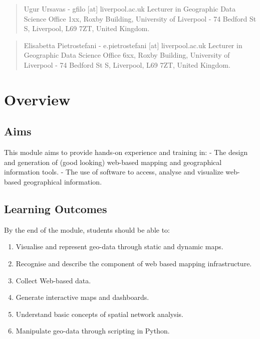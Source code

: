 \documentclass[
  letterpaper,
  DIV=11,
  numbers=noendperiod]{scrreprt}
\providecommand{\tightlist}{%
  \setlength{\itemsep}{0pt}\setlength{\parskip}{0pt}}\usepackage{longtable,booktabs,array}
\begin{document}
\begin{quote}
Ugur Ursavas - gfilo {[}at{]} liverpool.ac.uk Lecturer in Geographic
Data Science Office 1xx, Roxby Building, University of Liverpool - 74
Bedford St S, Liverpool, L69 7ZT, United Kingdom.
\end{quote}

\begin{quote}
Elisabetta Pietrostefani - e.pietrostefani {[}at{]} liverpool.ac.uk
Lecturer in Geographic Data Science Office 6xx, Roxby Building,
University of Liverpool - 74 Bedford St S, Liverpool, L69 7ZT, United
Kingdom.
\end{quote}


\chapter*{Overview}\label{overview}


\section*{Aims}\label{aims}


This module aims to provide hands-on experience and training in: - The
design and generation of (good looking) web-based mapping and
geographical information tools. - The use of software to access, analyse
and visualize web-based geographical information.

\section*{Learning Outcomes}\label{learning-outcomes}


By the end of the module, students should be able to:

\begin{enumerate}
\def\labelenumi{(\arabic{enumi})}
\setcounter{enumi}{1}
\tightlist
\item
  Visualise and represent geo-data through static and dynamic maps.
\item
  Recognise and describe the component of web based mapping
  infrastructure.
\item
  Collect Web-based data.
\item
  Generate interactive maps and dashboards.
\item
  Understand basic concepts of spatial network analysis.
\item
  Manipulate geo-data through scripting in Python.
\end{enumerate}
\end{document}

